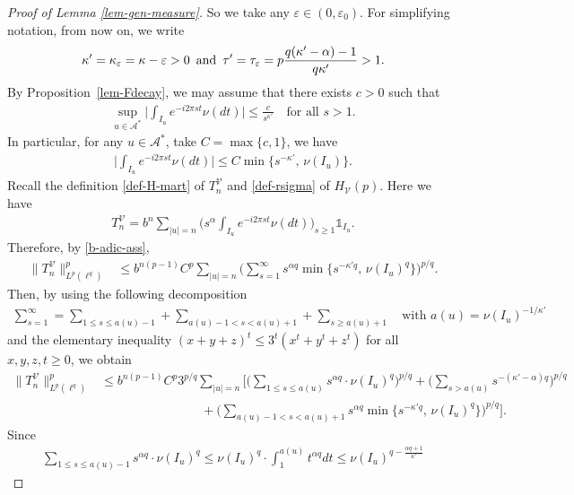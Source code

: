 \documentclass[12pt]{amsart}
\theoremstyle{definition}
\theoremstyle{remark}
\newcommand{\Ab}{\mathcal{A}}
\newcommand{\an}{\text{\, and \,}}
\newcommand{\indi}{\mathds{1}}
\numberwithin{equation}{section}
\begin{document}
\begin{proof}[Proof of Lemma \ref{lem-gen-measure}]
So we  take any  $\varepsilon\in (0, \varepsilon_0)$. For simplifying notation, from now on, we  write 
\[
 \kappa' = \kappa_\varepsilon= \kappa - \varepsilon>0 \an \tau'= \tau_\varepsilon = p\frac{ q (\kappa' - \alpha)  -1}{q \kappa'}> 1. 
\] 
By Proposition~\ref{lem-Fdecay},   we may  assume  that there exists  $c>0$ such that 
\begin{align*}
\sup_{u\in \Ab^*} \Big|\int_{I_u}e^{-i 2\pi st}\nu(dt)\Big| \le \frac{c}{s^{\kappa'}} \quad \text{for all $s>1$}. 
\end{align*}
In particular,  for any $u\in \Ab^*$,  take $C = \max\{c, 1\}$, we have 
\begin{align}\label{b-adic-ass}
\Big|\int_{I_u}e^{-i 2\pi st}\nu(dt)\Big| \le  C \min\big\{ s^{-\kappa'},\, \nu(I_u) \big\}.
\end{align}
Recall the definition \eqref{def-H-mart} of $T_n^\mathcal{V}$ and \eqref{def-rsigma} of $H_\mathcal{V}(p)$.  Here we have 
\begin{align*}
 T_n^{\mathcal{V}} =   b^n \sum_{|u|=n}      \Big(    s^\alpha \int_{I_u}  e^{-i 2 \pi s t}\nu(dt)\Big)_{s \ge 1}  \indi_{I_u}.
\end{align*}
Therefore,  by \eqref{b-adic-ass}, 
\begin{align*}
\|T_n^{\mathcal{V}}\|_{L^p(\ell^q)}^p & \le  b^{n(p-1)}  C^p  \sum_{|u|=n}     \Big( \sum_{s=1}^\infty   s^{\alpha q}    \min\big\{ s^{-\kappa' q},\, \nu(I_u)^q \big\} \Big)^{p/q}. 
\end{align*}
Then, by using the following decomposition 
\begin{align*}
\sum_{s=1}^\infty   =\sum_{1\le s\le a(u)-1}  + \sum_{ a(u)-1<s<a(u)+1} + \sum_{s\ge a(u)+1}\quad \text{with $a(u)= \nu(I_u)^{-1/\kappa'}$}
\end{align*}
and the elementary inequality $(x+y +z)^t\le  3^t (x^t + y^t +z^t)$ for all $x, y, z, t \ge 0$, we obtain 
\begin{align*}
\|T_n^{\mathcal{V}}\|_{L^p(\ell^q)}^p & \le  b^{n(p-1)}  C^p  3^{p/q}  \sum_{|u|=n}     \Big[ \Big(   \sum_{1\le s\le a(u) }    s^{\alpha q}    \cdot  \nu(I_u)^q  \Big)^{p/q} +   \Big(\sum_{s> a(u)}    s^{-(\kappa'-\alpha)q}\Big)^{p/q} 
\\
& \qquad\qquad  \qquad \qquad   + \Big(\sum_{ a(u)-1<s<a(u)+1}  s^{\alpha q}    \min\big\{ s^{-\kappa' q},\, \nu(I_u)^q \big\} \Big)^{p/q}\Big]. 
\end{align*}
Since 
\begin{align*}
\sum_{1\le s\le a(u) -1 }    s^{\alpha q} \cdot  \nu(I_u)^q  \le  \nu(I_u)^q  \cdot \int_1^{a(u)}  t^{\alpha q} dt  \le \nu(I_u)^{q-\frac{\alpha q +1}{\kappa'}}

\end{align*}
\end{proof}
\end{document}
